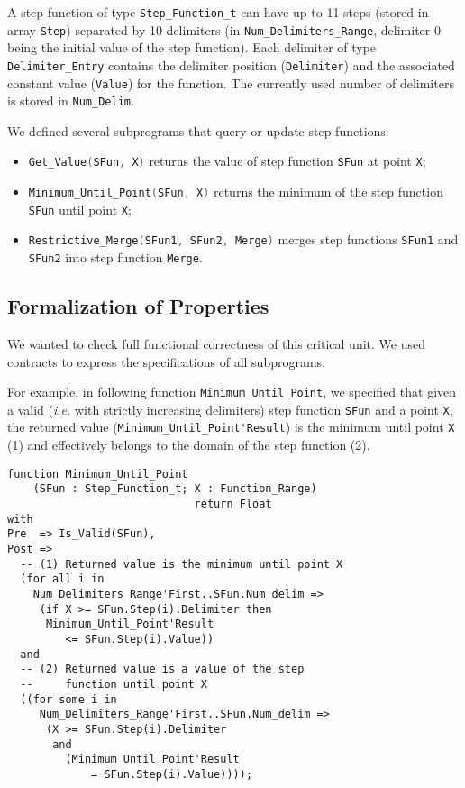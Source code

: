 \documentclass[10pt,a4paper,twocolumn]{article}
\newcommand{\ie}{\textit{i.e.}\xspace}
\newcommand{\SPARK}[1]{\lstinline[language=Ada,basicstyle={\footnotesize
      \sffamily},framesep=0pt]$#1$}
\begin{document}
A step function of type \SPARK{Step_Function_t} can have up to 11
steps (stored in array \SPARK{Step}) separated by 10 delimiters (in
\SPARK{Num_Delimiters_Range},
delimiter 0 being the initial value of the step function). Each
delimiter of type \SPARK{Delimiter_Entry} contains the delimiter
position (\SPARK{Delimiter}) and the associated constant value
(\SPARK{Value}) for the function. The currently used number of
delimiters is stored in \SPARK{Num_Delim}.

We defined several subprograms that query or update step functions:
\begin{itemize}
\item \SPARK{Get_Value(SFun, X)} returns the value of step function \SPARK{SFun}
  at point \SPARK{X};
\item \SPARK{Minimum_Until_Point(SFun, X)} returns the minimum of the step
  function \SPARK{SFun} until point \SPARK{X};
\item \SPARK{Restrictive_Merge(SFun1, SFun2, Merge)} merges step functions
  \SPARK{SFun1} and \SPARK{SFun2} into step function \SPARK{Merge}.
\end{itemize}

\subsection{Formalization of Properties}

We wanted to check full functional correctness of this critical unit. We used
contracts to express the specifications of all subprograms.

For example, in following function \SPARK{Minimum_Until_Point}, we
specified that given a valid (\ie with strictly increasing delimiters)
step function \SPARK{SFun} and a point \SPARK{X}, the returned value
(\SPARK{Minimum_Until_Point'Result}) is the minimum until point \SPARK{X} (1)
and effectively belongs to the domain of the step function (2).

\begin{lstlisting}
function Minimum_Until_Point
    (SFun : Step_Function_t; X : Function_Range)
                             return Float
with
Pre  => Is_Valid(SFun),
Post =>
  -- (1) Returned value is the minimum until point X
  (for all i in
    Num_Delimiters_Range'First..SFun.Num_delim =>
     (if X >= SFun.Step(i).Delimiter then
      Minimum_Until_Point'Result
         <= SFun.Step(i).Value))
  and
  -- (2) Returned value is a value of the step
  --     function until point X
  ((for some i in
     Num_Delimiters_Range'First..SFun.Num_delim =>
      (X >= SFun.Step(i).Delimiter
       and
         (Minimum_Until_Point'Result
             = SFun.Step(i).Value))));
\end{lstlisting}
\end{document}

